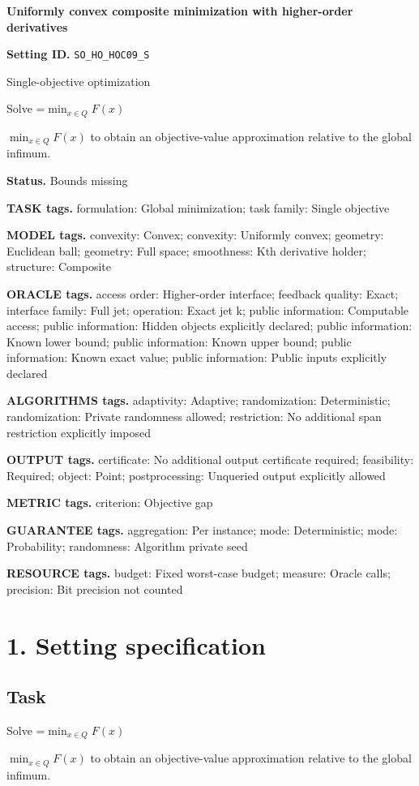 \documentclass[10pt,a4paper]{article}
\newcommand{\AtlasMath}[1]{\par\begingroup\centering\setbox0=\hbox{$\displaystyle #1$}\ifdim\wd0>1.4\linewidth\typeout{ATLAS WIDE FORMULA: \the\wd0}\fi\ifdim\wd0>\linewidth\resizebox{\linewidth}{!}{\box0}\else\box0\fi\par\endgroup}
\newcommand{\AtlasInlineMath}[1]{\begingroup\setbox0=\hbox{$#1$}\ifdim\wd0>.4\linewidth\endgroup\AtlasMath{#1}\else\endgroup$#1$\fi}
\begin{document}
\raggedright

{\LARGE\bfseries\sffamily\color{AtlasNavy} Uniformly convex composite minimization with higher-order derivatives\par}\vspace{5pt}
\textbf{Setting ID.} \texttt{SO\_\allowbreak{}HO\_\allowbreak{}HOC09\_\allowbreak{}S}

Single-objective optimization

Solve \AtlasInlineMath{\min_{x\in Q}F(x)} to obtain an objective-value approximation relative to the global infimum.

\textbf{Status.} Bounds missing

\textbf{TASK tags.} formulation: Global minimization; task family: Single objective

\textbf{MODEL tags.} convexity: Convex; convexity: Uniformly convex; geometry: Euclidean ball; geometry: Full space; smoothness: Kth derivative holder; structure: Composite

\textbf{ORACLE tags.} access order: Higher-order interface; feedback quality: Exact; interface family: Full jet; operation: Exact jet k; public information: Computable access; public information: Hidden objects explicitly declared; public information: Known lower bound; public information: Known upper bound; public information: Known exact value; public information: Public inputs explicitly declared

\textbf{ALGORITHMS tags.} adaptivity: Adaptive; randomization: Deterministic; randomization: Private randomness allowed; restriction: No additional span restriction explicitly imposed

\textbf{OUTPUT tags.} certificate: No additional output certificate required; feasibility: Required; object: Point; postprocessing: Unqueried output explicitly allowed

\textbf{METRIC tags.} criterion: Objective gap

\textbf{GUARANTEE tags.} aggregation: Per instance; mode: Deterministic; mode: Probability; randomness: Algorithm private seed

\textbf{RESOURCE tags.} budget: Fixed worst-case budget; measure: Oracle calls; precision: Bit precision not counted

\section{1. Setting specification}
\subsection{Task}
Solve \AtlasInlineMath{\min_{x\in Q}F(x)} to obtain an objective-value approximation relative to the global infimum.
\end{document}
